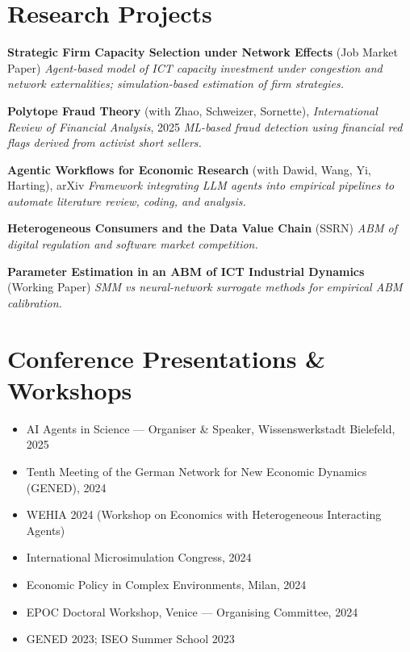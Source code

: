 \documentclass[a4paper,11pt]{article}
\begin{document}
\section{Research Projects}

\textbf{Strategic Firm Capacity Selection under Network Effects} (Job Market Paper)  
\emph{Agent-based model of ICT capacity investment under congestion and network externalities; simulation-based estimation of firm strategies.}

\textbf{Polytope Fraud Theory} (with Zhao, Schweizer, Sornette), \emph{International Review of Financial Analysis}, 2025  
\emph{ML-based fraud detection using financial red flags derived from activist short sellers.}

\textbf{Agentic Workflows for Economic Research} (with Dawid, Wang, Yi, Harting), arXiv  
\emph{Framework integrating LLM agents into empirical pipelines to automate literature review, coding, and analysis.}

\textbf{Heterogeneous Consumers and the Data Value Chain} (SSRN)  
\emph{ABM of digital regulation and software market competition.}

\textbf{Parameter Estimation in an ABM of ICT Industrial Dynamics} (Working Paper)  
\emph{SMM vs neural-network surrogate methods for empirical ABM calibration.}

\section{Conference Presentations \& Workshops}

\begin{itemize}
\item AI Agents in Science — Organiser \& Speaker, Wissenswerkstadt Bielefeld, 2025  
\item Tenth Meeting of the German Network for New Economic Dynamics (GENED), 2024  
\item WEHIA 2024 (Workshop on Economics with Heterogeneous Interacting Agents)  
\item International Microsimulation Congress, 2024  
\item Economic Policy in Complex Environments, Milan, 2024  
\item EPOC Doctoral Workshop, Venice — Organising Committee, 2024  
\item GENED 2023; ISEO Summer School 2023  
\end{itemize}
\end{document}
